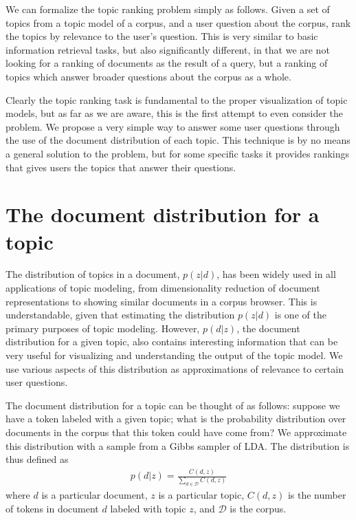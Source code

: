 \documentclass{article}
\begin{document}
We can formalize the topic ranking problem simply as follows.  Given a set of
topics from a topic model of a corpus, and a user question about the corpus,
rank the topics by relevance to the user's question.  This is very similar to
basic information retrieval tasks, but also significantly different, in that we
are not looking for a ranking of documents as the result of a query, but a
ranking of topics which answer broader questions about the corpus as a whole.

Clearly the topic ranking task is fundamental to the proper visualization of
topic models, but as far as we are aware, this is the first attempt to even
consider the problem.  We propose a very simple way to answer some user
questions through the use of the document distribution of each topic.  This
technique is by no means a general solution to the problem, but for some
specific tasks it provides rankings that gives users the topics that answer
their questions.

\section{The document distribution for a topic}
\label{sec:docdist}

The distribution of topics in a document, $p(z|d)$, has been widely used in all
applications of topic modeling, from dimensionality reduction of document
representations to showing similar documents in a corpus browser.  This is
understandable, given that estimating the distribution $p(z|d)$ is one of the
primary purposes of topic modeling.  However, $p(d|z)$, the document
distribution for a given topic, also contains interesting information that can
be very useful for visualizing and understanding the output of the topic model.
We use various aspects of this distribution as approximations of relevance to
certain user questions.

The document distribution for a topic can be thought of as follows: suppose we
have a token labeled with a given topic; what is the probability distribution
over documents in the corpus that this token could have come from?  We
approximate this distribution with a sample from a Gibbs sampler of LDA.  The
distribution is thus defined as
\begin{align}
  \label{eq:entropy}
  p(d|z) = \frac{C(d,z)}{\sum_{d \in \mathcal{D}} C(d,z)}
\end{align}
where $d$ is a particular document, $z$ is a particular topic, $C(d,z)$ is the
number of tokens in document $d$ labeled with topic $z$, and $\mathcal{D}$ is
the corpus.
\end{document}
